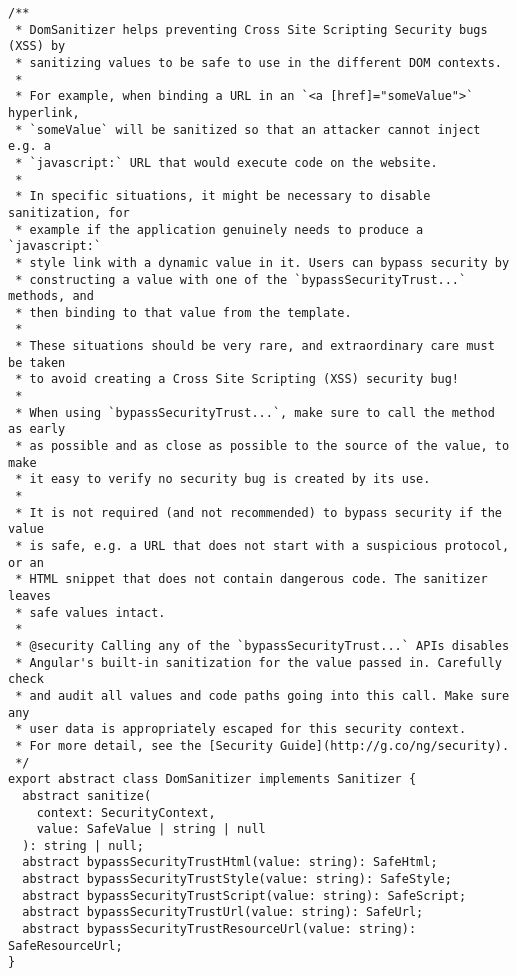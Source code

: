 \begin{verbatim}
/**
 * DomSanitizer helps preventing Cross Site Scripting Security bugs (XSS) by
 * sanitizing values to be safe to use in the different DOM contexts.
 *
 * For example, when binding a URL in an `<a [href]="someValue">` hyperlink,
 * `someValue` will be sanitized so that an attacker cannot inject e.g. a
 * `javascript:` URL that would execute code on the website.
 *
 * In specific situations, it might be necessary to disable sanitization, for
 * example if the application genuinely needs to produce a `javascript:`
 * style link with a dynamic value in it. Users can bypass security by
 * constructing a value with one of the `bypassSecurityTrust...` methods, and
 * then binding to that value from the template.
 *
 * These situations should be very rare, and extraordinary care must be taken
 * to avoid creating a Cross Site Scripting (XSS) security bug!
 *
 * When using `bypassSecurityTrust...`, make sure to call the method as early
 * as possible and as close as possible to the source of the value, to make
 * it easy to verify no security bug is created by its use.
 *
 * It is not required (and not recommended) to bypass security if the value
 * is safe, e.g. a URL that does not start with a suspicious protocol, or an
 * HTML snippet that does not contain dangerous code. The sanitizer leaves
 * safe values intact.
 *
 * @security Calling any of the `bypassSecurityTrust...` APIs disables
 * Angular's built-in sanitization for the value passed in. Carefully check
 * and audit all values and code paths going into this call. Make sure any
 * user data is appropriately escaped for this security context.
 * For more detail, see the [Security Guide](http://g.co/ng/security).
 */
export abstract class DomSanitizer implements Sanitizer {
  abstract sanitize(
    context: SecurityContext,
    value: SafeValue | string | null
  ): string | null;
  abstract bypassSecurityTrustHtml(value: string): SafeHtml;
  abstract bypassSecurityTrustStyle(value: string): SafeStyle;
  abstract bypassSecurityTrustScript(value: string): SafeScript;
  abstract bypassSecurityTrustUrl(value: string): SafeUrl;
  abstract bypassSecurityTrustResourceUrl(value: string): SafeResourceUrl;
}
\end{verbatim}
